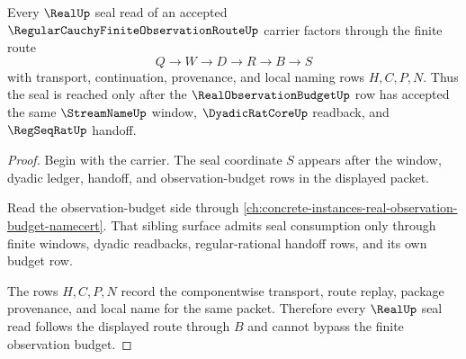 \begin{theorem}
\label{thm:regular-cauchy-finite-observation-route-realseal-handoff}
Every $\RealUp$ seal read of an accepted $\RegularCauchyFiniteObservationRouteUp$ carrier factors through the finite route
$$
Q \to W \to D \to R \to B \to S
$$
with transport, continuation, provenance, and local naming rows $H,C,P,N$. Thus the seal is reached only after the $\RealObservationBudgetUp$ row has accepted the same $\StreamNameUp$ window, $\DyadicRatCoreUp$ readback, and $\RegSeqRatUp$ handoff.
\end{theorem}
\begin{proof}
Begin with the carrier. The seal coordinate $S$ appears after the window, dyadic ledger, handoff, and observation-budget rows in the displayed packet.

Read the observation-budget side through \autoref{ch:concrete-instances-real-observation-budget-namecert}. That sibling surface admits seal consumption only through finite windows, dyadic readbacks, regular-rational handoff rows, and its own budget row.

The rows $H,C,P,N$ record the componentwise transport, route replay, package provenance, and local name for the same packet. Therefore every $\RealUp$ seal read follows the displayed route through $B$ and cannot bypass the finite observation budget.
\end{proof}

